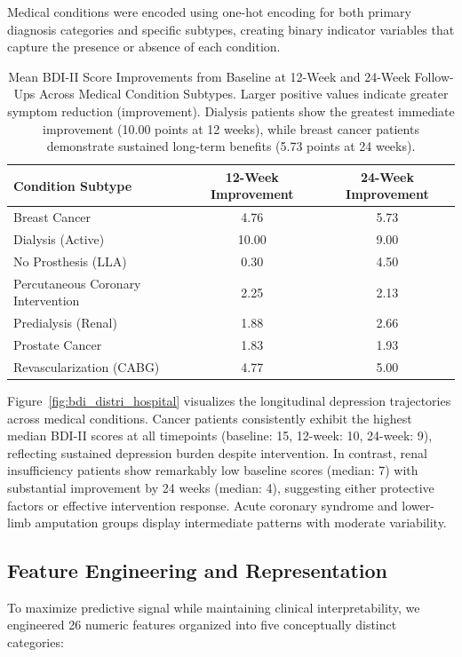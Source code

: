 \documentclass[conference]{IEEEtran}
\begin{document}
Medical conditions were encoded using one-hot encoding for both primary diagnosis categories and specific subtypes, creating binary indicator variables that capture the presence or absence of each condition.

\begin{table}[ht]
\centering
\caption{Mean BDI-II Score Improvements from Baseline at 12-Week and 24-Week Follow-Ups Across Medical Condition Subtypes. Larger positive values indicate greater symptom reduction (improvement). Dialysis patients show the greatest immediate improvement (10.00 points at 12 weeks), while breast cancer patients demonstrate sustained long-term benefits (5.73 points at 24 weeks).}
\begin{tabularx}{\linewidth}{|X|c|c|}
\hline
\textbf{Condition Subtype} & \textbf{12-Week Improvement} & \textbf{24-Week Improvement} \\
\hline
Breast Cancer & 4.76 & 5.73 \\ 
Dialysis (Active) & 10.00 & 9.00 \\ 
No Prosthesis (LLA) & 0.30 & 4.50 \\ 
Percutaneous Coronary Intervention & 2.25 & 2.13 \\ 
Predialysis (Renal) & 1.88 & 2.66 \\ 
Prostate Cancer & 1.83 & 1.93 \\ 
Revascularization (CABG) & 4.77 & 5.00 \\ 
\hline
\end{tabularx}
\label{tab:bdii_improvement}
\end{table}

Figure~\ref{fig:bdi_distri_hospital} visualizes the longitudinal depression trajectories across medical conditions. Cancer patients consistently exhibit the highest median BDI-II scores at all timepoints (baseline: 15, 12-week: 10, 24-week: 9), reflecting sustained depression burden despite intervention. In contrast, renal insufficiency patients show remarkably low baseline scores (median: 7) with substantial improvement by 24 weeks (median: 4), suggesting either protective factors or effective intervention response. Acute coronary syndrome and lower-limb amputation groups display intermediate patterns with moderate variability.

\subsection{Feature Engineering and Representation}

To maximize predictive signal while maintaining clinical interpretability, we engineered 26 numeric features organized into five conceptually distinct categories:
\end{document}
